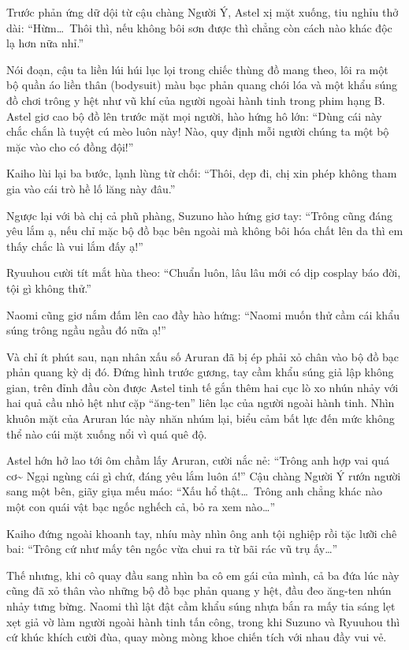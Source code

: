 \documentclass[../main.tex]{subfiles}
\begin{document}
Trước phản ứng dữ dội từ cậu chàng Người Ý, Astel xị mặt xuống, tiu nghỉu thở dài: ``Hừm\dots\ Thôi thì, nếu không bôi sơn được thì chẳng còn cách nào khác độc lạ hơn nữa nhỉ.''

Nói đoạn, cậu ta liền lúi húi lục lọi trong chiếc thùng đồ mang theo, lôi ra một bộ quần áo liền thân (bodysuit) màu bạc phản quang chói lóa và một khẩu súng đồ chơi trông y hệt như vũ khí của người ngoài hành tinh trong phim hạng B. Astel giơ cao bộ đồ lên trước mặt mọi người, hào hứng hô lớn: ``Dùng cái này chắc chắn là tuyệt cú mèo luôn này! Nào, quy định mỗi người chúng ta một bộ mặc vào cho có đồng đội!''

Kaiho lùi lại ba bước, lạnh lùng từ chối: ``Thôi, dẹp đi, chị xin phép không tham gia vào cái trò hề lố lăng này đâu.''

Ngược lại với bà chị cả phũ phàng, Suzuno hào hứng giơ tay: ``Trông cũng đáng yêu lắm ạ, nếu chỉ mặc bộ đồ bạc bên ngoài mà không bôi hóa chất lên da thì em thấy chắc là vui lắm đấy ạ!''

Ryuuhou cười tít mắt hùa theo: ``Chuẩn luôn, lâu lâu mới có dịp cosplay báo đời, tội gì không thử.''

Naomi cũng giơ nắm đấm lên cao đầy hào hứng: ``Naomi muốn thử cầm cái khẩu súng trông ngầu ngầu đó nữa ạ!''

Và chỉ ít phút sau, nạn nhân xấu số Aruran đã bị ép phải xỏ chân vào bộ đồ bạc phản quang kỳ dị đó. Đứng hình trước gương, tay cầm khẩu súng giả lập không gian, trên đỉnh đầu còn được Astel tinh tế gắn thêm hai cục lò xo nhún nhảy với hai quả cầu nhỏ hệt như cặp ``ăng-ten'' liên lạc của người ngoài hành tinh. Nhìn khuôn mặt của Aruran lúc này nhăn nhúm lại, biểu cảm bất lực đến mức không thể nào cúi mặt xuống nổi vì quá quê độ.


Astel hớn hở lao tới ôm chầm lấy Aruran, cười nắc nẻ: ``Trông anh hợp vai quá cơ\~{} Ngại ngùng cái gì chứ, đáng yêu lắm luôn á!'' Cậu chàng Người Ý rướn người sang một bên, giãy giụa mếu máo: ``Xấu hổ thật\dots\ Trông anh chẳng khác nào một con quái vật bạc ngốc nghếch cả, bỏ ra xem nào\dots''

Kaiho đứng ngoài khoanh tay, nhíu mày nhìn ông anh tội nghiệp rồi tặc lưỡi chê bai: ``Trông cứ như mấy tên ngốc vừa chui ra từ bãi rác vũ trụ ấy\dots''

Thế nhưng, khi cô quay đầu sang nhìn ba cô em gái của mình, cả ba đứa lúc này cũng đã xỏ thân vào những bộ đồ bạc phản quang y hệt, đầu đeo ăng-ten nhún nhảy tưng bừng. Naomi thì lật đật cầm khẩu súng nhựa bắn ra mấy tia sáng lẹt xẹt giả vờ làm người ngoài hành tinh tấn công, trong khi Suzuno và Ryuuhou thì cứ khúc khích cười đùa, quay mòng mòng khoe chiến tích với nhau đầy vui vẻ.
\end{document}

